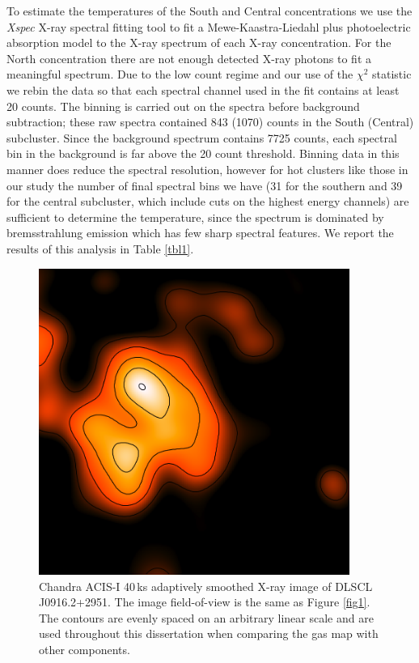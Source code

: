 To estimate the temperatures of the South and Central concentrations we use the \emph{Xspec} X-ray spectral fitting tool \citep{Arnaud:1996vl} to fit a Mewe-Kaastra-Liedahl plus photoelectric absorption model \citep[fixed to the Leiden/Argentine/Bonn value;][]{Kalberla:2005de} to the X-ray spectrum of each X-ray concentration.  
For the North concentration there are not enough detected X-ray photons to fit a meaningful spectrum.  
Due to the low count regime and our use of the $\chi^2$ statistic we rebin the data so that each spectral channel used in the fit contains at least 20 counts.
The binning is carried out on the spectra before background subtraction; these raw spectra contained 843 (1070) counts in the South (Central) subcluster.
Since the background spectrum contains 7725 counts, each spectral bin in the background is far above the 20 count threshold.
Binning data in this manner does reduce the spectral resolution, however for hot clusters like those in our study the number of final spectral bins we have (31 for the southern and 39 for the central subcluster, which include cuts on the highest energy channels) are sufficient to determine the temperature, since the spectrum is dominated by bremsstrahlung emission which has few sharp spectral features. 
We report the results of this analysis in Table \ref{tbl1}.

\begin{figure}
\centering
\includegraphics[width=4in]{Chapter2/XrayMapwithContours.png}
\caption[X-ray map of the Musket Ball Cluster]{
Chandra ACIS-I 40\,ks adaptively smoothed X-ray image of DLSCL J0916.2+2951.
The image field-of-view is the same as Figure \ref{fig1}.
The contours are evenly spaced on an arbitrary linear scale and are used throughout this dissertation when comparing the gas map with other components.
\label{figure:MusketBallXray}}
\end{figure}

